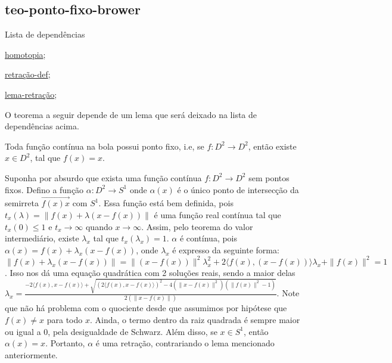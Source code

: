 \subsection{teo-ponto-fixo-brower} %
\label{teo-ponto-fixo-brower}
\begin{titlemize}{Lista de dependências}
	\item \hyperref[homotopia]{homotopia};\\ %
	\item \hyperref[retração-def]{retração-def};\\
    \item \hyperref[lema-retração]{lema-retração};\\
\end{titlemize}
O teorema a seguir depende de um lema que será deixado na lista de dependências acima.
\begin{thm}[Teorema do Ponto Fixo de Brower]%
	Toda função contínua na bola possui ponto fixo, i.e, se $f:D^2 \longrightarrow D^2$, então existe $x \in D^2$, tal que $f(x) = x$.
\end{thm}

\begin{dem}
    Suponha por absurdo que exista uma função contínua $f:D^2 \longrightarrow D^2$ sem pontos fixos. Defino a função $\alpha: D^2 \longrightarrow S^1$ onde $\alpha(x)$ é o único ponto de intersecção da semirreta $\overrightarrow{f(x)x}$ com $S^1$. Essa função está bem definida, pois $t_x(\lambda) = \|f(x) + \lambda(x - f(x))\|$ é uma função real contínua tal que $t_x(0) \leq 1$ e $t_x \to \infty$ quando $x \to \infty$. Assim, pelo teorema do valor intermediário, existe $\lambda_x$ tal que $t_x(\lambda_x) = 1$. $\alpha$ é contínua, pois $\alpha(x) = f(x) + \lambda_x(x - f(x))$, onde $\lambda_x$ é expresso da seguinte forma:
    $\|f(x) + \lambda_x(x - f(x))\| = \|(x - f(x))\|^2\lambda_x^2 + 2\langle f(x), (x - f(x)) \rangle\lambda_x + \|f(x)\|^2 = 1$. Isso nos dá uma equação quadrática com 2 soluções reais, sendo a maior delas $\lambda_x = \frac{-2\langle f(x), x - f(x)\rangle + \sqrt{(2\langle f(x), x - f(x)\rangle)^2 - 4(\|x - f(x)\|^2)(\|f(x)\|^2 - 1)}}{2(\|x - f(x)\|)}$. Note que não há problema com o quociente desde que assumimos por hipótese que $f(x) \ne x$ para todo $x$. Ainda, o termo dentro da raiz quadrada é sempre maior ou igual a 0, pela desigualdade de Schwarz. Além disso, se $x \in S^1$, então $\alpha(x) = x$. Portanto, $\alpha$ é uma retração, contrariando o lema mencionado anteriormente.

\end{dem}

